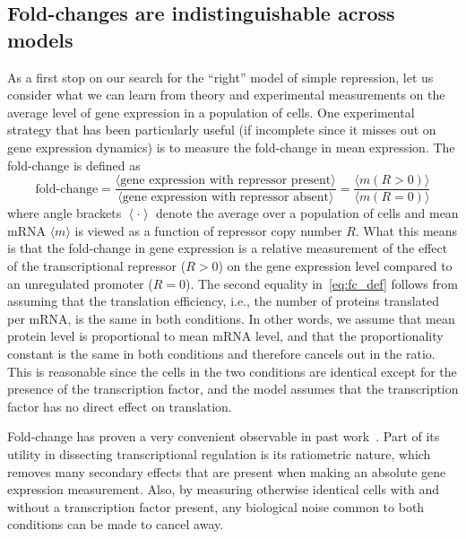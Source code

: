 
\subsection{Fold-changes are indistinguishable across models}
As a first stop on our search for the ``right'' model of simple repression, let
us consider what we can learn from theory and experimental measurements on the
average level of gene expression in a population of cells. One experimental
strategy that has been particularly useful (if incomplete since it misses out on
gene expression dynamics) is to measure the fold-change in mean expression. The
fold-change is defined as
\begin{equation}
\text{fold-change}
= \frac{\langle \text{gene expression with repressor present} \rangle}
        {\langle \text{gene expression with repressor absent} \rangle}
= \frac{\langle m (R > 0) \rangle}{\langle m (R = 0) \rangle}
\label{eq:fc_def}
\end{equation}
where angle brackets $\left\langle \cdot \right\rangle$ denote the average over
a population of cells and mean mRNA $\langle m\rangle$ is viewed as a function
of repressor copy number $R$. What this means is that the fold-change in gene
expression is a relative measurement of the effect of the transcriptional 
repressor ($R > 0$) on the gene expression level compared to an unregulated
promoter ($R = 0$). The second equality in~\ref{eq:fc_def} follows from assuming
that the translation efficiency, i.e., the number of proteins translated per
mRNA, is the same in both conditions. In other words, we assume that mean
protein level is proportional to mean mRNA level, and that the proportionality
constant is the same in both conditions and therefore cancels out in the ratio.
This is reasonable since the cells in the two conditions are identical except
for the presence of the transcription factor, and the model assumes that the
transcription factor has no direct effect on translation.

Fold-change has proven a very convenient observable in past
work~\cite{Garcia2011a, Brewster2014, Razo-Mejia2018, Chure2019}. Part of its
utility in dissecting transcriptional regulation is its ratiometric nature,
which removes many secondary effects that are present when making an absolute
gene expression measurement. Also, by measuring otherwise identical cells with
and without a transcription factor present, any biological noise common to both
conditions can be made to cancel away.

